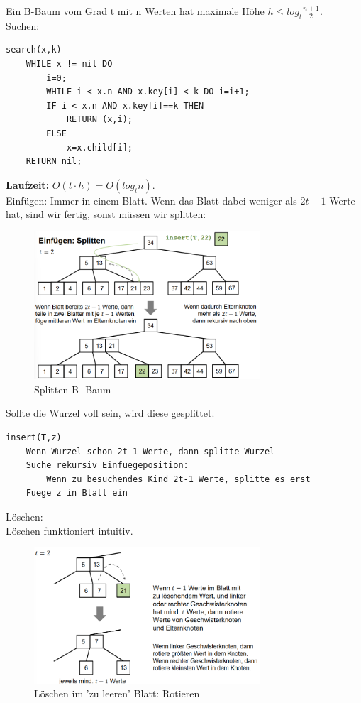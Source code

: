 \documentclass{article}
\begin{document}
            Ein B-Baum vom Grad t mit n Werten hat maximale Höhe $h \leq log_t \frac{n+1}{2}$.\\
            Suchen:
            \begin{lstlisting}[style=pseudocode]
search(x,k)
    WHILE x != nil DO
        i=0;
        WHILE i < x.n AND x.key[i] < k DO i=i+1;
        IF i < x.n AND x.key[i]==k THEN
            RETURN (x,i);
        ELSE
            x=x.child[i];
    RETURN nil; 
            \end{lstlisting}
            \textbf{Laufzeit:} $O(t\cdot h) = O(log_t n)$.\\
            Einfügen: Immer in einem Blatt. Wenn das Blatt dabei weniger als $2t-1$ Werte hat, sind wir fertig, sonst müssen wir splitten:\\
            \begin{figure}[ht]
                \centering
                \includegraphics[width=0.75\textwidth]{Bilder/SplittenBB.png}
                \caption{Splitten B- Baum}
                \label{fig:SplittenBB}
            \end{figure}
            Sollte die Wurzel voll sein, wird diese gesplittet.\\
            \begin{lstlisting}[style=pseudocode]
insert(T,z)
    Wenn Wurzel schon 2t-1 Werte, dann splitte Wurzel
    Suche rekursiv Einfuegeposition:
        Wenn zu besuchendes Kind 2t-1 Werte, splitte es erst
    Fuege z in Blatt ein
            \end{lstlisting}
            Löschen:\\
            Löschen funktioniert intuitiv.\\
            \begin{figure}[ht]
                \centering
                \includegraphics[width=0.75\textwidth]{Bilder/BBdel1.png}
                \caption{Löschen im 'zu leeren' Blatt: Rotieren}
                \label{fig:BBdel1}
            \end{figure}\\
\end{document}
